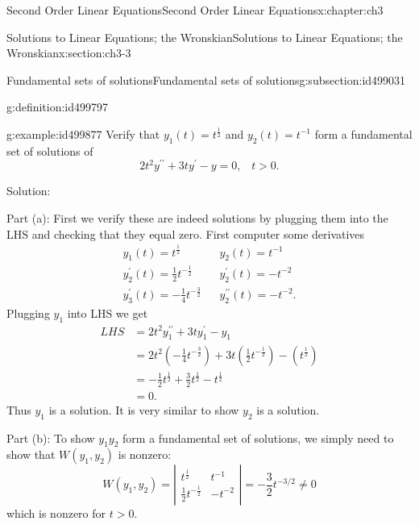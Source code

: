 \documentclass[oneside,10pt,]{book}
\numberwithin{equation}{section}
\numberwithin{equation}{section}
\newcommand{\amp}{&}
\begin{document}
\begin{chapterptx}{Second Order Linear Equations}{}{Second Order Linear Equations}{}{}{x:chapter:ch3}
\begin{sectionptx}{Solutions to Linear Equations; the Wronskian}{}{Solutions to Linear Equations; the Wronskian}{}{}{x:section:ch3-3}
\begin{subsectionptx}{Fundamental sets of solutions}{}{Fundamental sets of solutions}{}{}{g:subsection:id499031}
\begin{definition}{}{g:definition:id499797}
\end{definition}
\begin{example}{}{g:example:id499877}%
Verify that \(y_{1}(t)=t^{\frac{1}{2}}\) and \(y_{2}(t)=t^{-1}\) form a fundamental set of solutions of%
\begin{equation*}
2t^{2}y^{\prime\prime}+3ty^{\prime}-y=0,\,\,\,\,\,t>0.
\end{equation*}
%
\par
Solution:%
\par
Part (a): First we verify these are indeed solutions by plugging them into the LHS and checking that they equal zero. First computer some derivatives%
\begin{equation*}
\begin{array}{ccc}
y_{1}(t)=t^{\frac{1}{2}} \amp  \amp y_{2}(t)=t^{-1}\\
y_{2}^{\prime}(t)=\frac{1}{2}t^{-\frac{1}{2}} \amp  \amp y_{2}^{\prime}(t)=-t^{-2}\\
y_{3}^{\prime}(t)=-\frac{1}{4}t^{-\frac{3}{2}} \amp  \amp y_{2}^{\prime\prime}(t)=-t^{-2}.
\end{array}
\end{equation*}
Plugging \(y_{1}\) into LHS we get%
\begin{align*}
LHS \amp =2t^{2}y_{1}^{\prime\prime}+3ty_{1}^{\prime}-y_{1}\\
\amp =2t^{2}\left(-\frac{1}{4}t^{-\frac{3}{2}}\right)+3t\left(\frac{1}{2}t^{-\frac{1}{2}}\right)-\left(t^{\frac{1}{2}}\right)\\
\amp =-\frac{1}{2}t^{\frac{1}{2}}+\frac{3}{2}t^{\frac{1}{2}}-t^{\frac{1}{2}}\\
\amp =0.
\end{align*}
Thus \(y_{1}\) is a solution. It is very similar to show \(y_{2}\) is a solution.%
\par
Part (b): To show \(y_{1}y_{2}\) form a fundamental set of solutions, we simply need to show that \(W(y_{1},y_{2})\) is nonzero:%
\begin{equation*}
W(y_{1},y_{2})=\left|\begin{array}{cc}
t^{\frac{1}{2}} \amp t^{-1}\\
\frac{1}{2}t^{-\frac{1}{2}} \amp -t^{-2}
\end{array}\right|=-\frac{3}{2}t^{-3/2}\neq0
\end{equation*}
which is nonzero for \(t>0\).%
\end{example}
\end{subsectionptx}
\end{sectionptx}
%
%
\typeout{************************************************}

\end{chapterptx}
\end{document}

